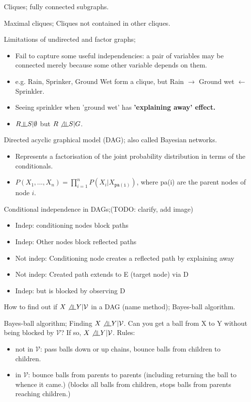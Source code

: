 \documentclass{article}
\newcommand{\indep}{\rotatebox[origin=c]{90}{$\models$}}
\begin{document}
Cliques; fully connected subgraphs.

Maximal cliques; Cliques not contained in other cliques.

Limitations of undirected and factor graphs; \begin{itemize} \item Fail to capture some useful independencies: a pair of variables may be connected merely because some other variable depends on them.  \item e.g. Rain, Sprinker, Ground Wet form a clique, but Rain $\rightarrow$ Ground wet $\leftarrow$  Sprinkler.  \item Seeing sprinkler when 'ground wet' has \bf{'explaining away'} effect.  \item $R \indep S|\emptyset$ but $R \not\indep S | G$.  \end{itemize}

Directed acyclic graphical model (DAG); also called Bayesian networks. \begin{itemize} \item Represents a factorisation of the joint probability distribution in terms of the conditionals.  \item $P(X_1,...,X_n)=\prod_{i=1}^n P(X_i|X_\mathtt{pa(i)})$, where pa(i) are the parent nodes of node $i$.  \end{itemize}

Conditional independence in DAGs;(TODO: clarify, add image) \begin{itemize} \item Indep: conditioning nodes block paths \item Indep: Other nodes block reflected paths \item Not indep: Conditioning node creates a reflected path by explaining away \item Not indep: Created path extends to E (target node) via D \item Indep: but is blocked by observing D \end{itemize}

How to find out if $X \not \indep Y | \mathcal{V}$ in a DAG (name method); Bayes-ball algorithm.

Bayes-ball algorithm; Finding $X \not \indep Y | \mathcal{V}$. \newline Can you get a ball from X to Y without being blocked by $\mathcal{V}$? If so, $X \not \indep Y | \mathcal{V}$. Rules: \begin{itemize} \item not in $\mathcal{V}$: pass balls down or up chains, bounce balls from children to children.  \item in $\mathcal{V}$: bounce balls from parents to parents (including returning the ball to whence it came.) (blocks all balls from children, stops balls from parents reaching children.) \end{itemize}
\end{document}
